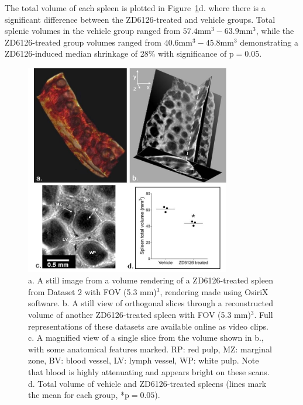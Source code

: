 	The total volume of each spleen is plotted in Figure~\ref{fig:3}d. where there is a significant difference between the ZD6126-treated and vehicle groups. Total splenic volumes in the vehicle group ranged from $57.4\text{mm}^3 − 63.9\text{mm}^3$, while the ZD6126-treated group volumes ranged from $40.6\text{mm}^3 − 45.8\text{mm}^3$ demonstrating a ZD6126-induced median shrinkage of 28\% with significance of $\text{p}=0.05$.
	
	\begin{figure}%
		\centering
		\includegraphics[width=0.8\textwidth]{spleen_img/spleen_Figure3.jpg}
		\caption{a. A still image from a volume rendering of a ZD6126-treated spleen from Dataset 2 with FOV (5.3 mm)$^3$, rendering made using OsiriX software. \cite{rossetosirix:2004}  b. A still view of orthogonal slices through a reconstructed volume of another ZD6126-treated spleen with FOV (5.3 mm)$^3$.  Full representations of these datasets are available online as video clips. c. A magnified view of a single slice from the volume shown in b., with some anatomical features marked. RP: red pulp, MZ: marginal zone, BV: blood vessel, LV: lymph vessel, WP: white pulp. Note that blood is highly attenuating and appears bright on these scans. d. Total volume of vehicle and ZD6126-treated spleens (lines mark the mean for each group, *$\text{p}=0.05$).}
		\label{fig:3}
	\end{figure}
	
